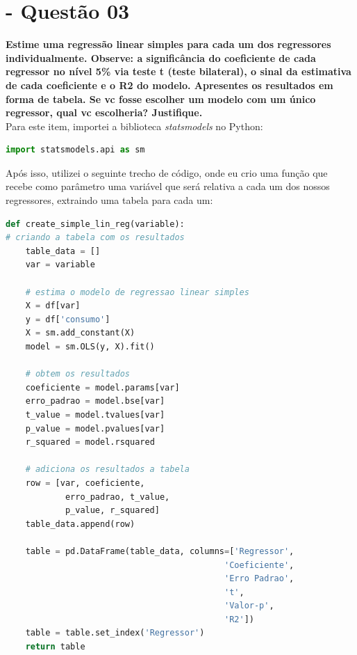 \documentclass[a4paper, 12pt]{article}
\begin{document}
\section{- Questão 03}
\textbf{Estime uma regressão linear simples para cada um dos regressores individualmente. Observe: a significância do coeficiente de cada regressor no nível 5\% via teste t (teste bilateral), o sinal da estimativa de cada coeficiente e o R2 do modelo. Apresentes os resultados
em forma de tabela. Se vc fosse escolher um modelo com um único regressor, qual vc escolheria? Justifique.} \\

Para este item, importei a biblioteca \textit{statsmodels} no Python:


\begin{tcolorbox}[colback=white,boxrule=1pt,arc=5pt,auto outer arc]
  \begin{lstlisting}[language=Python]
        import statsmodels.api as sm
    \end{lstlisting}
\end{tcolorbox}

Após isso, utilizei o seguinte trecho de código, onde eu crio uma função que recebe como parâmetro uma variável que será relativa a cada um dos nossos regressores, extraindo uma tabela para cada um:


\begin{tcolorbox}[colback=white,boxrule=1pt,arc=5pt,auto outer arc]
  \begin{lstlisting}[language=Python]
def create_simple_lin_reg(variable):
# criando a tabela com os resultados
    table_data = []
    var = variable

    # estima o modelo de regressao linear simples
    X = df[var]
    y = df['consumo']
    X = sm.add_constant(X)
    model = sm.OLS(y, X).fit()

    # obtem os resultados
    coeficiente = model.params[var]
    erro_padrao = model.bse[var]
    t_value = model.tvalues[var]
    p_value = model.pvalues[var]
    r_squared = model.rsquared

    # adiciona os resultados a tabela
    row = [var, coeficiente, 
            erro_padrao, t_value, 
            p_value, r_squared]
    table_data.append(row)

    table = pd.DataFrame(table_data, columns=['Regressor', 
                                            'Coeficiente', 
                                            'Erro Padrao', 
                                            't', 
                                            'Valor-p', 
                                            'R2'])
    table = table.set_index('Regressor')
    return table
    \end{lstlisting}
\end{tcolorbox}
\end{document}
